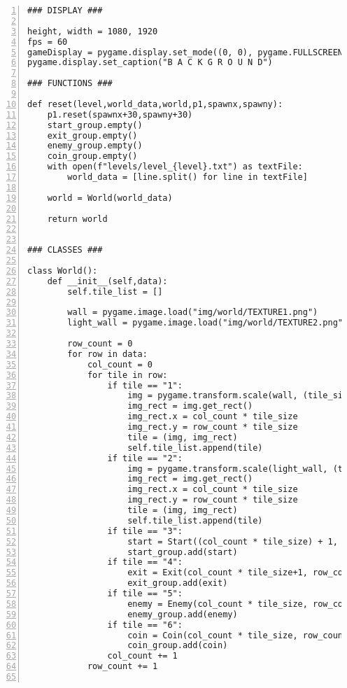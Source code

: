 \documentclass[12pt]{report}
\begin{document}
\begin{Verbatim}[numbers=left, frame=single]
### DISPLAY ###

height, width = 1080, 1920                                                                 
fps = 60
gameDisplay = pygame.display.set_mode((0, 0), pygame.FULLSCREEN)                                      
pygame.display.set_caption("B A C K G R O U N D")                                                    

### FUNCTIONS ###

def reset(level,world_data,world,p1,spawnx,spawny):
    p1.reset(spawnx+30,spawny+30)                                                                           
    start_group.empty()
    exit_group.empty()
    enemy_group.empty()
    coin_group.empty()
    with open(f"levels/level_{level}.txt") as textFile:
        world_data = [line.split() for line in textFile]

    world = World(world_data)

    return world

    
### CLASSES ###

class World():
    def __init__(self,data):
        self.tile_list = []

        wall = pygame.image.load("img/world/TEXTURE1.png")                                            
        light_wall = pygame.image.load("img/world/TEXTURE2.png")

        row_count = 0
        for row in data:
            col_count = 0
            for tile in row:
                if tile == "1":
                    img = pygame.transform.scale(wall, (tile_size + 1, tile_size))
                    img_rect = img.get_rect()
                    img_rect.x = col_count * tile_size
                    img_rect.y = row_count * tile_size
                    tile = (img, img_rect)
                    self.tile_list.append(tile)
                if tile == "2":
                    img = pygame.transform.scale(light_wall, (tile_size + 1, tile_size))
                    img_rect = img.get_rect()
                    img_rect.x = col_count * tile_size
                    img_rect.y = row_count * tile_size 
                    tile = (img, img_rect)
                    self.tile_list.append(tile)
                if tile == "3":
                    start = Start((col_count * tile_size) + 1, row_count * tile_size)
                    start_group.add(start)
                if tile == "4":
                    exit = Exit(col_count * tile_size+1, row_count * tile_size)
                    exit_group.add(exit)
                if tile == "5":
                    enemy = Enemy(col_count * tile_size, row_count * tile_size)
                    enemy_group.add(enemy)
                if tile == "6":
                    coin = Coin(col_count * tile_size, row_count * tile_size)
                    coin_group.add(coin)
                col_count += 1
            row_count += 1


\end{Verbatim}
\end{document}
